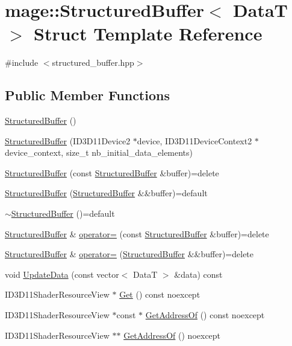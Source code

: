 \hypertarget{structmage_1_1_structured_buffer}{}\section{mage\+:\+:Structured\+Buffer$<$ DataT $>$ Struct Template Reference}
\label{structmage_1_1_structured_buffer}


{\ttfamily \#include $<$structured\+\_\+buffer.\+hpp$>$}

\subsection*{Public Member Functions}
\begin{DoxyCompactItemize}
\item 
\hyperlink{structmage_1_1_structured_buffer_a621e2b92cf91e50d3639680a716eb0c6}{Structured\+Buffer} ()
\item 
\hyperlink{structmage_1_1_structured_buffer_a9ba747c0666b96c17e3711266ee74aa0}{Structured\+Buffer} (I\+D3\+D11\+Device2 $\ast$device, I\+D3\+D11\+Device\+Context2 $\ast$device\+\_\+context, size\+\_\+t nb\+\_\+initial\+\_\+data\+\_\+elements)
\item 
\hyperlink{structmage_1_1_structured_buffer_aa017416099a12305d0177094c768150e}{Structured\+Buffer} (const \hyperlink{structmage_1_1_structured_buffer}{Structured\+Buffer} \&buffer)=delete
\item 
\hyperlink{structmage_1_1_structured_buffer_a455bd930f39f5fdf6af4f453694997da}{Structured\+Buffer} (\hyperlink{structmage_1_1_structured_buffer}{Structured\+Buffer} \&\&buffer)=default
\item 
\hyperlink{structmage_1_1_structured_buffer_a02ab1d322e1aef0c608b85224b80dbcf}{$\sim$\+Structured\+Buffer} ()=default
\item 
\hyperlink{structmage_1_1_structured_buffer}{Structured\+Buffer} \& \hyperlink{structmage_1_1_structured_buffer_ac00255155ab1eb61244392adcf262d40}{operator=} (const \hyperlink{structmage_1_1_structured_buffer}{Structured\+Buffer} \&buffer)=delete
\item 
\hyperlink{structmage_1_1_structured_buffer}{Structured\+Buffer} \& \hyperlink{structmage_1_1_structured_buffer_a2647510e153d15b89f860e2a5c68e231}{operator=} (\hyperlink{structmage_1_1_structured_buffer}{Structured\+Buffer} \&\&buffer)=delete
\item 
void \hyperlink{structmage_1_1_structured_buffer_aac2597ea7ee586207bf4918c3b4f9798}{Update\+Data} (const vector$<$ DataT $>$ \&data) const
\item 
I\+D3\+D11\+Shader\+Resource\+View $\ast$ \hyperlink{structmage_1_1_structured_buffer_ad933738bc55b10aea665913a8215bab0}{Get} () const noexcept
\item 
I\+D3\+D11\+Shader\+Resource\+View $\ast$const  $\ast$ \hyperlink{structmage_1_1_structured_buffer_a116faa593af2b0872cb266eabe6b58a8}{Get\+Address\+Of} () const noexcept
\item 
I\+D3\+D11\+Shader\+Resource\+View $\ast$$\ast$ \hyperlink{structmage_1_1_structured_buffer_a1e05bab8441b847c5b7cd11e2f5003e7}{Get\+Address\+Of} () noexcept
\end{DoxyCompactItemize}
